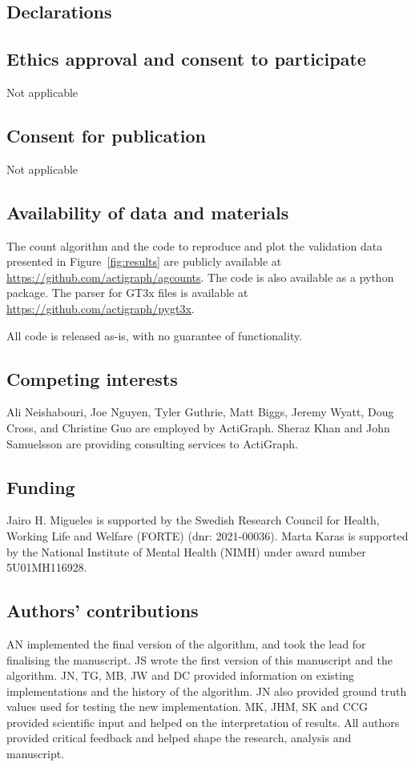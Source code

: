 \documentclass{bmcart}
\begin{document}
\begin{backmatter}
	\section*{Declarations}
	\subsection*{Ethics approval and consent to participate}
	Not applicable
	\subsection*{Consent for publication}
	Not applicable
	\subsection*{Availability of data and materials}
	The count algorithm and the code to reproduce and plot the validation
	data presented in Figure~\ref{fig:results} are publicly available at
	\url{https://github.com/actigraph/agcounts}. The code is also available as a
	python package. The parser for GT3x files is available at
	\url{https://github.com/actigraph/pygt3x}.

	All code is released as-is, with no guarantee of functionality.
	\subsection*{Competing interests}
	Ali Neishabouri, Joe Nguyen, Tyler Guthrie, Matt Biggs, Jeremy Wyatt,
	Doug Cross, and Christine Guo are employed by ActiGraph. Sheraz Khan and John
	Samuelsson are providing consulting services to ActiGraph.
	\subsection*{Funding}
	Jairo H. Migueles is supported by the Swedish Research Council for
	Health, Working Life and Welfare (FORTE) (dnr: 2021-00036). Marta Karas is supported by the National Institute of Mental Health (NIMH) under award number 5U01MH116928.

	\subsection*{Authors' contributions}
	AN implemented the final version of the algorithm, and took the lead for finalising the manuscript. JS wrote the first version of this manuscript and the algorithm. JN, TG, MB, JW and DC provided information on existing implementations and the history of the algorithm. JN also provided ground truth values used for testing the new implementation. MK, JHM, SK and CCG provided scientific input and helped on the interpretation of results.  All authors provided critical feedback and helped shape the research, analysis and manuscript.

\end{backmatter}
\end{document}

